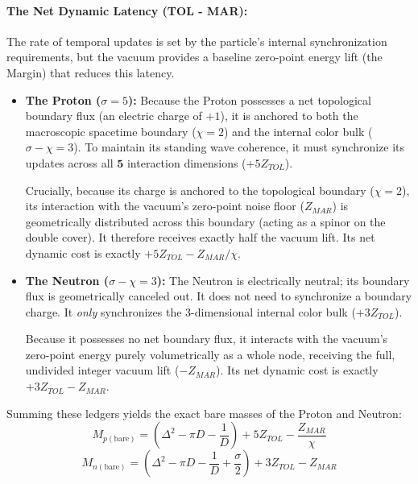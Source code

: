 \paragraph{The Net Dynamic Latency (TOL - MAR):}
The rate of temporal updates is set by the particle's internal synchronization requirements, but the vacuum provides a baseline zero-point energy lift (the Margin) that reduces this latency. 
\begin{itemize}
    \item \textbf{The Proton ($\sigma = 5$):} Because the Proton possesses a net topological boundary flux (an electric charge of $+1$), it is anchored to both the macroscopic spacetime boundary ($\chi=2$) and the internal color bulk ($\sigma-\chi=3$). To maintain its standing wave coherence, it must synchronize its updates across all $\mathbf{5}$ interaction dimensions ($+5Z_{TOL}$). 
    
    Crucially, because its charge is anchored to the topological boundary ($\chi=2$), its interaction with the vacuum's zero-point noise floor ($Z_{MAR}$) is geometrically distributed across this boundary (acting as a spinor on the double cover). It therefore receives exactly half the vacuum lift. Its net dynamic cost is exactly $+5Z_{TOL} - Z_{MAR}/\chi$.
    
    \item \textbf{The Neutron ($\sigma - \chi = 3$):} The Neutron is electrically neutral; its boundary flux is geometrically canceled out. It does not need to synchronize a boundary charge. It \textit{only} synchronizes the 3-dimensional internal color bulk ($+3Z_{TOL}$). 
    
    Because it possesses no net boundary flux, it interacts with the vacuum's zero-point energy purely volumetrically as a whole node, receiving the full, undivided integer vacuum lift ($-Z_{MAR}$). Its net dynamic cost is exactly $+3Z_{TOL} - Z_{MAR}$.
\end{itemize}

Summing these ledgers yields the exact bare masses of the Proton and Neutron:
\begin{equation}
    M_{p (\text{bare})} = \left(\Delta^2 - \pi D - \frac{1}{D}\right) + 5Z_{TOL} - \frac{Z_{MAR}}{\chi}
\end{equation}
\begin{equation}
    M_{n (\text{bare})} = \left(\Delta^2 - \pi D - \frac{1}{D} + \frac{\sigma}{2}\right) + 3Z_{TOL} - Z_{MAR}
\end{equation}

